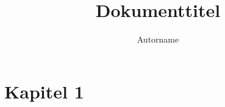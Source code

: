 \documentclass[ngerman]{scrartcl}
\title{Dokumenttitel}
\author{Autorname}
\begin{document}
 \maketitle

 \tableofcontents
 \cleardoublepage

 \section{Kapitel 1}
 \label{sec:kap1}

 \lipsum[1-15]
\end{document}
